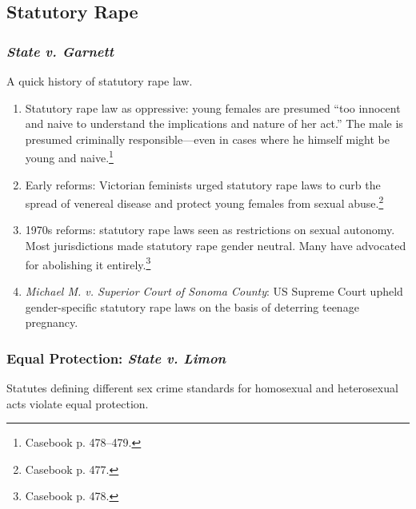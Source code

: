 \subsection{Statutory Rape}

\subsubsection{\emph{State v. Garnett}}

A quick history of statutory rape law.

\begin{enumerate}
    \item Statutory rape law as oppressive: young females are presumed ``too 
    innocent and naive to understand the implications and nature of her act.'' 
    The male is presumed criminally responsible---even in cases where he 
    himself might be young and naive.\footnote{Casebook p. 478--479.}
    \item Early reforms: Victorian feminists urged statutory rape laws to curb 
    the spread of venereal disease and protect young females from sexual 
    abuse.\footnote{Casebook p. 477.}
    \item 1970s reforms: statutory rape laws seen as restrictions on sexual 
    autonomy. Most jurisdictions made statutory rape gender neutral. Many have 
    advocated for abolishing it entirely.\footnote{Casebook p. 478.}
    \item \emph{Michael M. v. Superior Court of Sonoma County}: US Supreme 
    Court upheld gender-specific statutory rape laws on the basis of deterring 
    teenage pregnancy.
\end{enumerate}

\subsubsection{Equal Protection: \emph{State v. Limon}}

Statutes defining different sex crime standards for homosexual and 
heterosexual acts violate equal protection.

